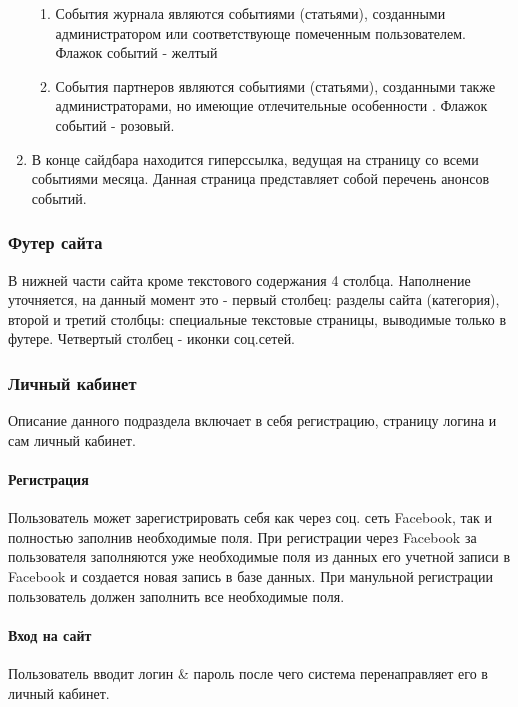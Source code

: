 \documentclass[DIV=calc, paper=a4, fontsize=11pt]{scrartcl} %
\begin{document}
\begin{enumerate}
        \begin{enumerate}
            \item События журнала являются событиями (статьями), созданными администратором или соответствующе помеченным пользователем. Флажок событий - желтый
            \item События партнеров являются событиями (статьями), созданными также администраторами, но имеющие отлечительные особенности . Флажок событий - розовый.
        \end{enumerate}
    \item В конце сайдбара находится гиперссылка, ведущая на страницу со всеми событиями месяца. Данная страница представляет собой перечень анонсов событий.
\end{enumerate}

\subsubsection{Футер сайта}
В нижней части сайта кроме текстового содержания 4 столбца. Наполнение уточняется, на данный момент это - первый столбец: разделы сайта (категория), второй и третий столбцы: специальные текстовые страницы, выводимые только в футере. Четвертый столбец - иконки соц.сетей.

\subsubsection{Личный кабинет}
Описание данного подраздела включает в себя регистрацию, страницу логина и сам личный кабинет.

\paragraph{Регистрация}
Пользователь может зарегистрировать себя как через соц. сеть Facebook, так и полностью заполнив необходимые поля. 
При регистрации через Facebook за пользователя заполняются уже необходимые поля из данных его учетной записи в Facebook и создается новая запись в базе данных. При манульной регистрации пользователь должен заполнить все  необходимые поля.

\paragraph{Вход на сайт}
Пользователь вводит логин \& пароль после чего система перенаправляет его в личный кабинет.
\end{document}
